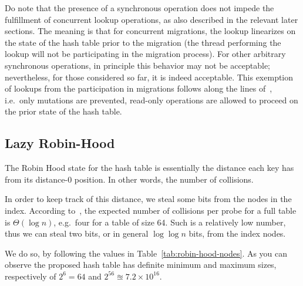 Do note that the presence of a synchronous operation does not impede the fulfillment of concurrent lookup operations, as also described in the relevant later sections.
The meaning is that for concurrent migrations, the lookup linearizes on the state of the hash table prior to the migration (the thread performing the lookup will not be participating in the migration process).
For other arbitrary synchronous operations, in principle this behavior may not be acceptable; nevertheless, for those considered so far, it is indeed acceptable.
This exemption of lookups from the participation in migrations follows along the lines of~\cite[\S5.3.2, Preventing Concurrent Updates to Ensure Consistency]{maier}, i.e.\ only mutations are prevented, read-only operations are allowed to proceed on the prior state of the hash table.


\subsection{Lazy Robin-Hood}\label{subsec:lazy-robin-hood}

The Robin Hood state for the hash table is essentially the distance each key has from its distance-0 position.
In other words, the number of collisions.

In order to keep track of this distance, we steal some bits from the nodes in the index.
According to~\cite[Corollary to Theorem~3]{robin-hood}, the expected number of collisions per probe for a full table is $\Theta(\log n)$, e.g.\ four for a table of size 64.
Such is a relatively low number, thus we can steal two bits, or in general $\log \log n$ bits, from the index nodes.

We do so, by following the values in Table~\ref{tab:robin-hood-nodes}.
As you can observe the proposed hash table has definite minimum and maximum sizes, respectively of $2^{6} = 64$ and $2^{56} \approxeq 7.2 \times 10^{16}$.

